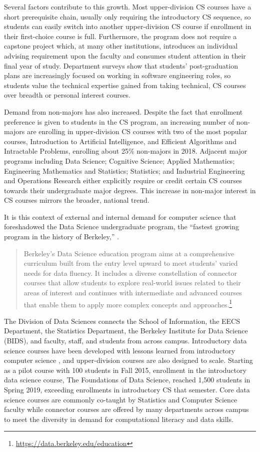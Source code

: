 Several factors contribute to this growth. Most upper-division CS courses have a short prerequisite chain, usually only requiring the introductory CS sequence, so students can easily switch into another upper-division CS course if enrollment in their first-choice course is full. Furthermore, the program does not require a capstone project which, at many other institutions, introduces an individual advising requirement upon the faculty and consumes student attention in their final year of study. Department surveys show that students' post-graduation plans are increasingly focused on working in software engineering roles, so students value the technical expertise gained from taking technical, CS courses over breadth or personal interest courses.

Demand from non-majors has also increased. Despite the fact that enrollment preference is given to students in the CS program, an increasing number of non-majors are enrolling in upper-division CS courses with two of the most popular courses, Introduction to Artificial Intelligence, and Efficient Algorithms and Intractable Problems, enrolling about 25\% non-majors in 2018. Adjacent major programs including Data Science; Cognitive Science; Applied Mathematics; Engineering Mathematics and Statistics; Statistics; and Industrial Engineering and Operations Research either explicitly require or credit certain CS courses towards their undergraduate major degrees. This increase in non-major interest in CS courses mirrors the broader, national trend.

It is this context of external and internal demand for computer science that foreshadowed the Data Science undergraduate program, the ``fastest growing program in the history of Berkeley,'' \cite{Alivisatos:2017}.
\begin{quote}
    Berkeley's Data Science education program aims at a comprehensive curriculum built from the entry level upward to meet students' varied needs for data fluency. It includes a diverse constellation of connector courses that allow students to explore real-world issues related to their areas of interest and continues with intermediate and advanced courses that enable them to apply more complex concepts and approaches.\footnote{\url{https://data.berkeley.edu/education}}
\end{quote}
The Division of Data Sciences connects the School of Information, the EECS Department, the Statistics Department, the Berkeley Institute for Data Science (BIDS), and faculty, staff, and students from across campus. Introductory data science courses have been developed with lessons learned from introductory computer science \cite{Swamy:2018}, and upper-division courses are also designed to scale. Starting as a pilot course with 100 students in Fall 2015, enrollment in the introductory data science course, The Foundations of Data Science, reached 1,500 students in Spring 2019, exceeding enrollments in introductory CS that semester. Core data science courses are commonly co-taught by Statistics and Computer Science faculty while connector courses are offered by many departments across campus to meet the diversity in demand for computational literacy and data skills.

